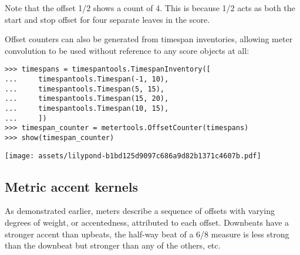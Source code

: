 \noindent Note that the offset 1/2 shows a count of 4. This is because 1/2 acts
as both the start and stop offset for four separate leaves in the score.

Offset counters can also be generated from timespan inventories, allowing meter
convolution to be used without reference to any score objects at all:

\begin{comment}
<abjad>
timespans = timespantools.TimespanInventory([
    timespantools.Timespan(-1, 10),
    timespantools.Timespan(5, 15),
    timespantools.Timespan(15, 20),
    timespantools.Timespan(10, 15),
    ])
timespan_counter = metertools.OffsetCounter(timespans)
show(timespan_counter)
</abjad>
\end{comment}

\begin{singlespacing}
\vspace{-0.5\baselineskip}
\begin{lstlisting}
>>> timespans = timespantools.TimespanInventory([
...     timespantools.Timespan(-1, 10),
...     timespantools.Timespan(5, 15),
...     timespantools.Timespan(15, 20),
...     timespantools.Timespan(10, 15),
...     ])
>>> timespan_counter = metertools.OffsetCounter(timespans)
>>> show(timespan_counter)
\end{lstlisting}
\noindent\texttt{[image: assets/lilypond-b1bd125d9097c686a9d82b1371c4607b.pdf]}
\end{singlespacing}

\subsection{Metric accent kernels} %

As demonstrated earlier, meters describe a sequence of offsets with varying
degrees of weight, or accentedness, attributed to each offset. Downbeats have a
stronger accent than upbeats, the half-way beat of a 6/8 measure is less strong
than the downbeat but stronger than any of the others, etc.

\begin{comment}
<abjad>
meter = metertools.Meter((4, 4))
kernel_44 = metertools.MetricAccentKernel.from_meter(meter, denominator=8)
for offset, weight in sorted(kernel_44.kernel.items()):
    print('{!s}\t{!s}'.format(offset, weight))

</abjad>
\end{comment}

